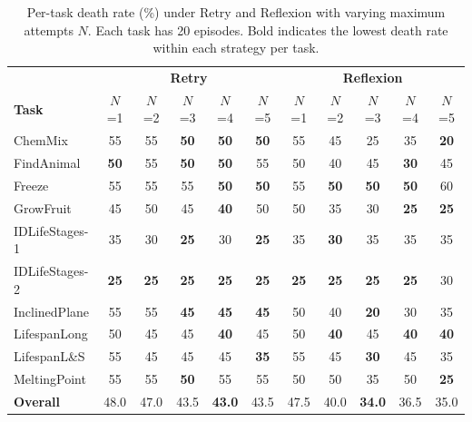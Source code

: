 \begin{table}[t]
\centering
\footnotesize
\caption{Per-task death rate (\%) under Retry and Reflexion with varying maximum attempts $N$. Each task has 20 episodes. Bold indicates the lowest death rate within each strategy per task.}
\label{tab:per-task-dose-response}
\setlength{\tabcolsep}{3.5pt}
\begin{tabular}{l|ccccc|ccccc}
\toprule
 & \multicolumn{5}{c|}{\textbf{Retry}} & \multicolumn{5}{c}{\textbf{Reflexion}} \\
\textbf{Task} & $N$=1 & $N$=2 & $N$=3 & $N$=4 & $N$=5 & $N$=1 & $N$=2 & $N$=3 & $N$=4 & $N$=5 \\
\midrule
ChemMix          & 55 & 55 & \textbf{50} & \textbf{50} & \textbf{50} & 55 & 45 & 25 & 35 & \textbf{20} \\
FindAnimal       & \textbf{50} & 55 & \textbf{50} & \textbf{50} & 55 & 50 & 40 & 45 & \textbf{30} & 45 \\
Freeze           & 55 & 55 & 55 & \textbf{50} & \textbf{50} & 55 & \textbf{50} & \textbf{50} & \textbf{50} & 60 \\
GrowFruit        & 45 & 50 & 45 & \textbf{40} & 50 & 50 & 35 & 30 & \textbf{25} & \textbf{25} \\
IDLifeStages-1   & 35 & 30 & \textbf{25} & 30 & \textbf{25} & 35 & \textbf{30} & 35 & 35 & 35 \\
IDLifeStages-2   & \textbf{25} & \textbf{25} & \textbf{25} & \textbf{25} & \textbf{25} & \textbf{25} & \textbf{25} & \textbf{25} & \textbf{25} & 30 \\
InclinedPlane    & 55 & 55 & \textbf{45} & \textbf{45} & \textbf{45} & 50 & 40 & \textbf{20} & 30 & 35 \\
LifespanLong     & 50 & 45 & 45 & \textbf{40} & 45 & 50 & \textbf{40} & 45 & \textbf{40} & \textbf{40} \\
LifespanL\&S     & 55 & 45 & 45 & 45 & \textbf{35} & 55 & 45 & \textbf{30} & 45 & 35 \\
MeltingPoint     & 55 & 55 & \textbf{50} & 55 & 55 & 50 & 50 & 35 & 50 & \textbf{25} \\
\midrule
\textbf{Overall} & 48.0 & 47.0 & 43.5 & \textbf{43.0} & 43.5 & 47.5 & 40.0 & \textbf{34.0} & 36.5 & 35.0 \\
\bottomrule
\end{tabular}
\end{table}
